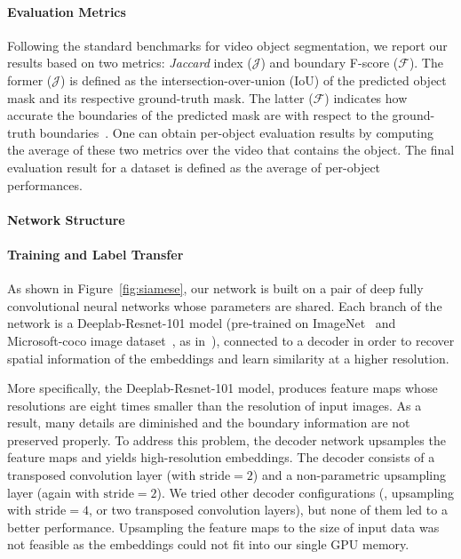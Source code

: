\documentclass[10pt,twocolumn,letterpaper]{article}
\begin{document}
\paragraph{Evaluation Metrics}

Following the standard benchmarks for video object segmentation, we report our
results based on two metrics: {\it Jaccard} index ($\mathcal{J}$) and boundary
F-score ($\mathcal{F}$). The former ($\mathcal{J}$) is defined as the
intersection-over-union (IoU) of the predicted object mask and its respective
ground-truth mask. The latter ($\mathcal{F}$) indicates how accurate the
boundaries of the predicted mask are with respect to the ground-truth
boundaries~\cite{davis_2017}. 
One can obtain per-object evaluation results by computing the average of these
two metrics over the video that contains the object. The final evaluation result
for a dataset is defined as the average of per-object performances.
\fi\paragraph{Network Structure}\paragraph{Training and Label Transfer}\iffalse
As shown in Figure~\ref{fig:siamese}, our network is built on a pair of deep
fully convolutional neural networks whose parameters are shared.
Each branch of the network is a Deeplab-Resnet-101 model (pre-trained on
ImageNet~\cite{imagenet} and Microsoft-coco image dataset~\cite{coco}, as in~\cite{onavos, Lix}), connected
to a decoder in order to recover spatial information of the embeddings and learn
similarity at a higher resolution.

More specifically, the Deeplab-Resnet-101 model, produces feature maps whose
resolutions are eight times smaller than the resolution of input images. As a
result, many details are diminished and the boundary information are not
preserved properly. To address this problem, the decoder network upsamples the
feature maps and yields high-resolution embeddings. The decoder consists of a
transposed convolution layer (with $\text{stride}=2$) and a non-parametric
upsampling layer (again with $\text{stride}=2$). We tried other decoder configurations (\eg,
upsampling with $\text{stride}=4$, or two transposed convolution layers), but none of
them led to a better performance. Upsampling the feature maps to the size of
input data was not feasible as the embeddings could not fit into our single GPU
memory.
\end{document}
